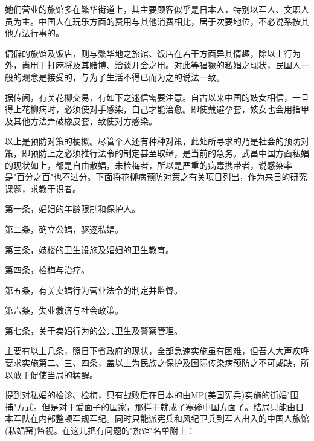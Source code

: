\documentclass[12pt,UTF8]{ctexbook}
\begin{document}
她们营业的旅馆多在繁华街道上，其主要顾客似乎是日本人，特别以军人、文职人员为主。中国人在玩乐方面的费用与其他消费相比，居于次要地位，不必说系按其他方法行事的。



偏僻的旅馆及饭店，则与繁华地之旅馆、饭店在若干方面异其情趣，除以上行为外，尚用于打麻将及其赌博、洽谈开会之用。对此等猖獗的私娼之现状，民国人一般的观念是接受的，与为了生活不得已而为之的说法一致。



据传闻，有关花柳交易，有如下之迷信需要注意。自古以来中国的妓女相信，一旦得上花柳病时，必须使对手感染，自己才能治愈。即使戴避孕套，妓女也会用指甲及其他方法弄破橡皮套，致使对方感染。



以上是预防对策的梗概。尽管个人还有种种对策，此处所寻求的乃是社会的预防对策，即预防上之必须推行法令的制定甚至取缔，是当前的急务。武昌中国方面私娼的现状如上，都是自由散娼，未检梅者，所以是严重的病毒携带者，说感染率是"百分之百"也不过分。下面将花柳病预防对策之有关项目列出，作为来日的研究课题，求教于识者。






第一条，娼妇的年龄限制和保护人。



第二条，确立公娼，驱逐私娼。



第三条，妓楼的卫生设施及娼妇的卫生教育。



第四条，检梅与治疗。



第五条，有关卖娼行为营业法令的制定并监督。



第六条，失业救济与社会政策。



第七条，关于卖娼行为的公共卫生及警察管理。



主要有以上几条，照日下省政府的现状，全部急速实施虽有困难，但吾人大声疾呼要求实施第二、三、四条，盖以上为民族之保护及国际传染病预防之不可或缺，所以敢于促使当局的猛醒。



提到对私娼的检诊、检梅，只有战败后在日本的由MP(美国宪兵)实施的街娼"围捕"方式。但是对于爱面子的国家，那样干就成了寒碜中国方面了。结局只能由日本军队在内部整顿军规军纪。同时只能派宪兵和风纪卫兵到军人出入的中国人旅馆(私娼窑)监视。在这儿把有问题的"旅馆"名单附上：
\end{document}
